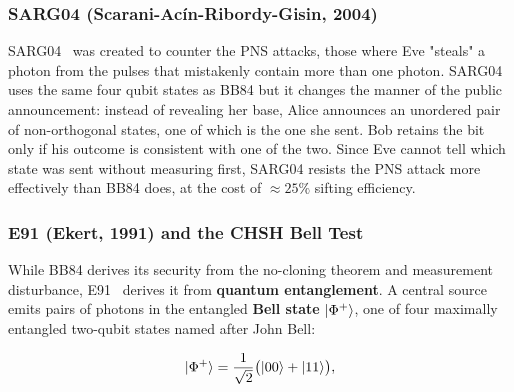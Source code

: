 \documentclass[12pt, a4paper]{article}
\begin{document}
\subsubsection{SARG04 (Scarani-Acín-Ribordy-Gisin, 2004)}
\label{sec:sarg04}

SARG04~\cite{sarg04} was created to counter the PNS attacks, those where Eve "steals" a photon from the pulses that mistakenly contain more than one photon. SARG04 uses the same four qubit states as BB84 but it changes the manner of the public announcement: instead of revealing her base, Alice announces an unordered pair of non-orthogonal states, one of which is the one she sent. Bob retains the bit only if his outcome is consistent with one of the two. Since Eve cannot tell which state was sent without measuring first, SARG04 resists the PNS attack more effectively than BB84 does, at the cost of $\approx 25\%$ sifting efficiency.

\subsubsection{E91 (Ekert, 1991) and the CHSH Bell Test}
\label{sec:e91}
 
While BB84 derives its security from the no-cloning theorem and measurement disturbance, E91~\cite{ekert1991} derives it from \textbf{quantum entanglement}.  A central source emits pairs of photons in the
entangled \textbf{Bell state} $\ket{\Phi^+}$, one of four maximally
entangled two-qubit states named after John Bell:

\begin{equation*}
  \ket{\Phi^+} = \frac{1}{\sqrt{2}}\bigl(\ket{00} + \ket{11}\bigr),
  \label{eq:bell-state}
\end{equation*}
\end{document}
